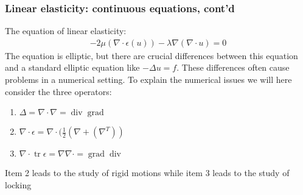 \begin{frame}
\frametitle{Linear elasticity: continuous equations, cont'd}
The equation of linear elasticity: 
\begin{align}
\label{el:eq}
-2 \mu (\nabla \cdot \epsilon (u)) - \lambda \nabla (\nabla \cdot u) = 0
\end{align}
The equation is  elliptic, but there are crucial differences between this equation
and a standard elliptic equation like $-\Delta u = f$. These differences often cause
problems in a numerical setting. To explain the numerical issues we will here
consider the three operators:
\begin{enumerate}
\item $\Delta  = \nabla\cdot\nabla  = \operatorname{div}\operatorname{grad} $
\item $\nabla \cdot \epsilon = \nabla\cdot(\frac{1}{2}(\nabla + (\nabla^T))$ 
\item $\nabla \cdot \operatorname{tr} \epsilon = \nabla \nabla \cdot = \operatorname{grad} \operatorname{div}$ 
\end{enumerate}
Item 2 leads to the study of rigid motions while item 3 leads to the study of locking 
\end{frame}

